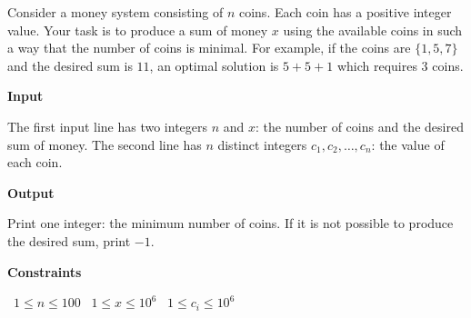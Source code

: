 Consider a money system consisting of $n$ coins. Each coin has a positive integer value. Your task is to produce a sum of money $x$ using the available coins in such a way that the number of coins is minimal.
For example, if the coins are $\{1,5,7\}$ and the desired sum is $11$, an optimal solution is $5+5+1$ which requires $3$ coins.

\vspace{0.3cm}\noindent\textbf{Input}

The first input line has two integers $n$ and $x$: the number of coins and the desired sum of money.
The second line has $n$ distinct integers $c_1,c_2,\dots,c_n$: the value of each coin.

\vspace{0.3cm}\noindent\textbf{Output}

Print one integer: the minimum number of coins. If it is not possible to produce the desired sum, print $-1$.

\vspace{0.3cm}\noindent\textbf{Constraints}

\textbullet\ $1 \le n \le 100$
\textbullet\ $1 \le x \le 10^6$
\textbullet\ $1 \le c_i \le 10^6$